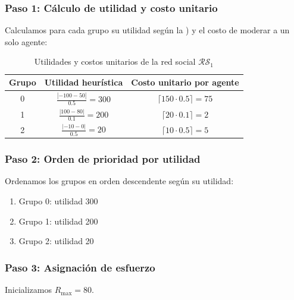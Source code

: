 \documentclass[11pt,letter]{article}
\begin{document}
\subsubsection*{Paso 1: Cálculo de utilidad y costo unitario}

Calculamos para cada grupo su utilidad según la ) y el costo de moderar a un solo agente:

\begin{table}[H]
\centering
\begin{tabular}{c|c|c}
\textbf{Grupo} & Utilidad heurística & Costo unitario por agente \\
\hline
0 & $\frac{|-100 - 50|}{0.5} = 300$ & $\lceil 150 \cdot 0.5 \rceil = 75$ \\
1 & $\frac{|100 - 80|}{0.1} = 200$ & $\lceil 20 \cdot 0.1 \rceil = 2$ \\
2 & $\frac{|-10 - 0|}{0.5} = 20$ & $\lceil 10 \cdot 0.5 \rceil = 5$ \\
\end{tabular}
\caption{Utilidades y costos unitarios de la red social $\mathcal{RS}_1$}
\end{table}

\subsubsection*{Paso 2: Orden de prioridad por utilidad}

Ordenamos los grupos en orden descendente según su utilidad:

\begin{enumerate}
    \item Grupo 0: utilidad 300
    \item Grupo 1: utilidad 200
    \item Grupo 2: utilidad 20
\end{enumerate}

\subsubsection*{Paso 3: Asignación de esfuerzo}

Inicializamos $R_{\text{max}} = 80$.
\end{document}
